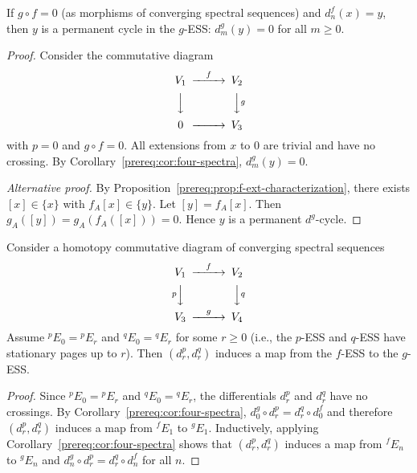 \begin{corollary}\label{prereq:cor:composition-zero}
    \leanok
    If $g \circ f = 0$ (as morphisms of converging spectral sequences) and $d_n^f(x) = y$, then $y$ is a permanent cycle in the $g$-ESS: $d_m^g(y) = 0$ for all $m \ge 0$.
\end{corollary}
\begin{proof}
    Consider the commutative diagram
    $$\begin{CD}
    V_1 @>{f}>> V_2 \\
    @VVV @VV{g}V \\
    0 @>>> V_3
    \end{CD}$$
    with $p = 0$ and $g \circ f = 0$. All extensions from $x$ to $0$ are trivial and have no crossing. By Corollary~\ref{prereq:cor:four-spectra}, $d_m^g(y) = 0$.

    \emph{Alternative proof.} By Proposition~\ref{prereq:prop:f-ext-characterization}, there exists $[x] \in \{x\}$ with $f_A[x] \in \{y\}$. Let $[y] = f_A[x]$. Then $g_A([y]) = g_A(f_A([x])) = 0$. Hence $y$ is a permanent $d^g$-cycle.
\end{proof}

\begin{corollary}\label{prereq:cor:ess-naturality}
    \leanok
    Consider a homotopy commutative diagram of converging spectral sequences
    $$\begin{CD}
    V_1 @>{f}>> V_2 \\
    @V{p}VV @VV{q}V \\
    V_3 @>{g}>> V_4
    \end{CD}$$
    Assume ${}^{p}\!E_0 = {}^{p}\!E_r$ and ${}^{q}\!E_0 = {}^{q}\!E_r$ for some $r \ge 0$ (i.e., the $p$-ESS and $q$-ESS have stationary pages up to $r$). Then $(d_r^p, d_r^q)$ induces a map from the $f$-ESS to the $g$-ESS.
\end{corollary}
\begin{proof}
    Since ${}^{p}\!E_0 = {}^{p}\!E_r$ and ${}^{q}\!E_0 = {}^{q}\!E_r$, the differentials $d_r^p$ and $d_r^q$ have no crossings. By Corollary~\ref{prereq:cor:four-spectra}, $d_0^g \circ d_r^p = d_r^q \circ d_0^f$ and therefore $(d_r^p, d_r^q)$ induces a map from ${}^{f}\!E_1$ to ${}^{g}\!E_1$. Inductively, applying Corollary~\ref{prereq:cor:four-spectra} shows that $(d_r^p, d_r^q)$ induces a map from ${}^{f}\!E_n$ to ${}^{g}\!E_n$ and $d_n^g \circ d_r^p = d_r^q \circ d_n^f$ for all $n$.
\end{proof}


